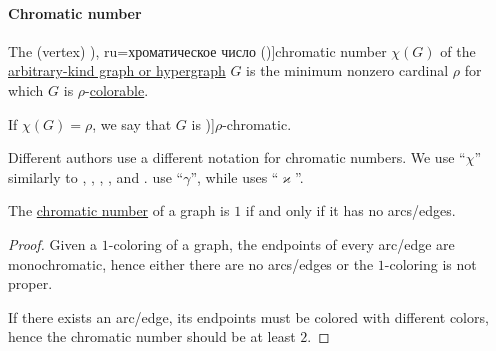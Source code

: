 \paragraph{Chromatic number}

\begin{definition}\label{def:graph_chromatic_number}
  The (vertex) \term[bg=хроматично число (\cite[142]{Мирчев2001Графи}), ru=хроматическое число (\cite[235]{ЕмеличевИПр1990Графы})]{chromatic number} \( \chi(G) \) of the \hyperref[rem:arbitrary_kind_graph]{arbitrary-kind graph or hypergraph} \( G \) is the minimum nonzero cardinal \( \rho \) for which \( G \) is \( \rho \)-\hyperref[def:graph_coloring/colorable]{colorable}.

  If \( \chi(G) = \rho \), we say that \( G \) is \term[ru=\( \rho \)-хроматический (граф) (\cite[236]{ЕмеличевИПр1990Графы})]{\( \rho \)-chromatic}.
\end{definition}
\begin{comments}
  \item Different authors use a different notation for chromatic numbers. We use \enquote{\( \chi \)} similarly to , , , ,  and .  use \enquote{\( \gamma \)}, while  uses \enquote{\( \varkappa \)}.
\end{comments}

\begin{proposition}\label{thm:chromatic_number_edgeless}
  The \hyperref[def:graph_chromatic_number]{chromatic number} of a graph is \( 1 \) if and only if it has no arcs/edges.
\end{proposition}
\begin{proof}
  \SufficiencySubProof Given a \( 1 \)-coloring of a graph, the endpoints of every arc/edge are monochromatic, hence either there are no arcs/edges or the \( 1 \)-coloring is not proper.

  \NecessitySubProof If there exists an arc/edge, its endpoints must be colored with different colors, hence the chromatic number should be at least \( 2 \).
\end{proof}

